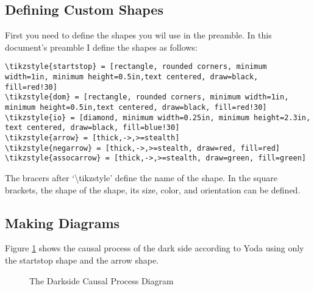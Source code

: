 \documentclass[12pt]{article}
\begin{document}
\subsection{Defining Custom Shapes}
First you need to define the shapes you wil use in the preamble. In this document's preamble I define the shapes as follows:
\begin{tiny}
\begin{verbatim}
\tikzstyle{startstop} = [rectangle, rounded corners, minimum width=1in, minimum height=0.5in,text centered, draw=black, fill=red!30]
\tikzstyle{dom} = [rectangle, rounded corners, minimum width=1in, minimum height=0.5in,text centered, draw=black, fill=red!30]
\tikzstyle{io} = [diamond, minimum width=0.25in, minimum height=2.3in, text centered, draw=black, fill=blue!30]
\tikzstyle{arrow} = [thick,->,>=stealth]
\tikzstyle{negarrow} = [thick,->,>=stealth, draw=red, fill=red]
\tikzstyle{assocarrow} = [thick,->,>=stealth, draw=green, fill=green]
\end{verbatim} 
\end{tiny}
The bracers {} after `\textbackslash{tikzstyle}' define the name of the shape. In the square brackets, the shape of the shape, its size, color, and orientation can be defined.
\FloatBarrier

\subsection{Making Diagrams}

Figure \ref{dside} shows the causal process of the dark side according to Yoda using only the startstop shape and the arrow shape.

\begin{centering}
\begin{figure} 
	\caption{\Large The Darkside Causal Process Diagram}
		\label{dside}
\end{figure}
\end{centering}
\end{document}
